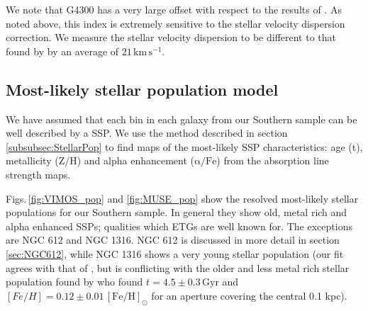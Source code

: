			We note that G4300 has a very large offset with respect to the results of \citet{Rampazzo2005}. As noted above, this index is extremely sensitive to the stellar velocity dispersion correction. We measure the stellar velocity dispersion to be different to that found by \citet{Rampazzo2005} by an average of $21\,\mathrm{km\,s^{-1}}$. 





	\subsection{Most-likely stellar population model}
		\label{subsec:ssp}
		We have assumed that each bin in each galaxy from our Southern sample can be well described by a SSP. We use the method described in section \ref{subsubsec:StellarPop} to find maps of the most-likely SSP characteristics: age (t), metallicity (Z/H) and alpha enhancement ($\mathrm{\alpha/Fe}$) from the absorption line strength maps. 

		Figs.\,\ref{fig:VIMOS_pop} and \ref{fig:MUSE_pop} show the resolved most-likely stellar populations for our Southern sample. In general they show old, metal rich and alpha enhanced SSPs; qualities which ETGs are well known for. The exceptions are NGC 612 and NGC 1316. NGC 612 is discussed in more detail in section \ref{sec:NGC612}, while NGC 1316 shows a very young stellar population (our fit agrees with that of \citealt{Kuntschner2000}, but is conflicting with the older and less metal rich stellar population found by \citealt{Koleva2011} who found $t=4.5 \pm 0.3 \,\mathrm{Gyr}$ and $[Fe/H]=0.12 \pm 0.01 \,\mathrm{[Fe/H]_\odot}$ for an aperture covering the central 0.1 kpc). 

